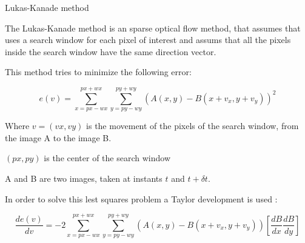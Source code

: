 Lukas-Kanade method

The Lukas-Kanade method is an sparse optical flow method, that assumes that 
uses a search window for each pixel of interest and assums that all the pixels 
inside the search window have the same direction vector.

This method tries to minimize the following error:

$$e(v)= \sum\limits_{x=px-wx}^{px+wx} \sum\limits_{y=py-wy}^{py+wy} (A(x,y) - B(x+v_x,y+v_y))^2$$

Where $v=(vx,vy)$ is the movement of the pixels of the search window, from the image A to the image B.

$(px,py)$ is the center of the search window

A and B are two images, taken at instants $t$ and $t+\delta t$.


In order to solve this lest squares problem a Taylor development is used :

$$\frac{de(v)}{dv} = -2 \sum\limits_{x=px-wx}^{px+wx} \sum\limits_{y=py-wy}^{py+wy} (A(x,y) - B(x+v_x,y+v_y)) [\frac{dB}{dx} \frac{dB}{dy}]$$


